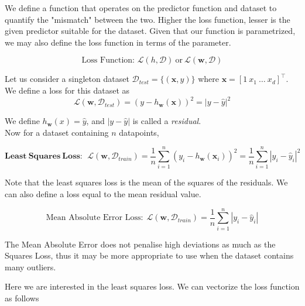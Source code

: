 \documentclass{report}
\newcommand{\tr}[1]{{{#1}^\top}} %
\newcommand{\w}{\mathbf{w}} %
\newcommand{\x}{\mathbf{x}}
\newcommand{\loss}{\mathcal{L}}
\begin{document}
We define a function that operates on the predictor function and dataset to quantify the "mismatch" between the two. Higher the loss function, lesser is the given predictor suitable for the dataset. Given that our function is parametrized, we may also define the loss function in terms of the parameter.

$$
  \text{Loss Function: } \loss(h,\mathcal{D}) ~\text{or}~ \loss(\w,\mathcal{D})
$$

Let us consider a singleton dataset $\mathcal{D}_{test} =\{(\x,y)\}$ where $\x = \tr{\left[1~x_1~\ldots~x_d\right]}$. We define a loss for this dataset as
$$
  \loss(\w,\mathcal{D}_{test}) = (y-h_\w(\x))^2 = |y-\hat{y}|^2
$$

We define \(h_\w(x) = \hat{y}\), and \(|y-\hat{y}|\) is called a \emph{residual}. \\

Now for a dataset containing $n$ datapoints,

$$
  \mathbf{Least\ Squares\ Loss:} \ \  \loss(\w,\mathcal{D}_{train}) = \frac{1}{n} \sum_{i=1}^n(y_i-h_\w(\x_i))^2 = \frac{1}{n} \sum_{i=1}^n \left|y_i - \hat{y}_i\right|^2
$$

Note that the least squares loss is the mean of the squares of the residuals. We can also define a loss equal to the mean residual value.

$$
  \text{Mean Absolute Error Loss:} \ \ \loss({\w,\mathcal{D}_{train}}) = \frac{1}{n} \sum_{i=1}^n \left|y_i - \hat{y}_i\right|
$$

The Mean Absolute Error does not penalise high deviations as much as the Squares Loss, thus it may be more appropriate to use when the dataset contains many outliers.
\begin{figure}[htbp]
  \centering
\end{figure}

Here we are interested in the least squares loss. We can vectorize the loss function as follows
\end{document}
